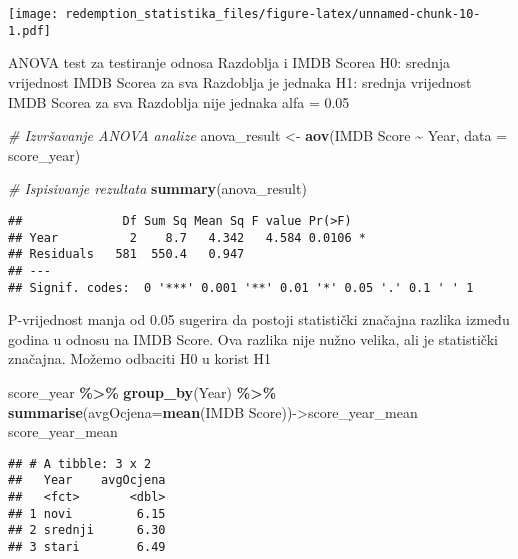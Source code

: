 \documentclass[
]{article}
\newenvironment{Shaded}{\begin{snugshade}}{\end{snugshade}}
\newcommand{\AttributeTok}[1]{\textcolor[rgb]{0.13,0.29,0.53}{#1}}
\newcommand{\CommentTok}[1]{\textcolor[rgb]{0.56,0.35,0.01}{\textit{#1}}}
\newcommand{\FunctionTok}[1]{\textcolor[rgb]{0.13,0.29,0.53}{\textbf{#1}}}
\newcommand{\NormalTok}[1]{#1}
\newcommand{\OtherTok}[1]{\textcolor[rgb]{0.56,0.35,0.01}{#1}}
\newcommand{\SpecialCharTok}[1]{\textcolor[rgb]{0.81,0.36,0.00}{\textbf{#1}}}
\newcommand{\StringTok}[1]{\textcolor[rgb]{0.31,0.60,0.02}{#1}}
\begin{document}
\texttt{[image: redemption\_statistika\_files/figure-latex/unnamed-chunk-10-1.pdf]}

ANOVA test za testiranje odnosa Razdoblja i IMDB Scorea H0: srednja
vrijednost IMDB Scorea za sva Razdoblja je jednaka H1: srednja
vrijednost IMDB Scorea za sva Razdoblja nije jednaka alfa = 0.05

\begin{Shaded}
\begin{Highlighting}[]
\CommentTok{\# Izvršavanje ANOVA analize}
\NormalTok{anova\_result }\OtherTok{\textless{}{-}} \FunctionTok{aov}\NormalTok{(}\StringTok{\textasciigrave{}}\AttributeTok{IMDB Score}\StringTok{\textasciigrave{}} \SpecialCharTok{\textasciitilde{}}\NormalTok{ Year, }\AttributeTok{data =}\NormalTok{ score\_year)}

\CommentTok{\# Ispisivanje rezultata}
\FunctionTok{summary}\NormalTok{(anova\_result)}
\end{Highlighting}
\end{Shaded}

\begin{verbatim}
##              Df Sum Sq Mean Sq F value Pr(>F)  
## Year          2    8.7   4.342   4.584 0.0106 *
## Residuals   581  550.4   0.947                 
## ---
## Signif. codes:  0 '***' 0.001 '**' 0.01 '*' 0.05 '.' 0.1 ' ' 1
\end{verbatim}

P-vrijednost manja od 0.05 sugerira da postoji statistički značajna
razlika između godina u odnosu na IMDB Score. Ova razlika nije nužno
velika, ali je statistički značajna. Možemo odbaciti H0 u korist H1

\begin{Shaded}
\begin{Highlighting}[]
\NormalTok{score\_year }\SpecialCharTok{\%\textgreater{}\%} \FunctionTok{group\_by}\NormalTok{(Year) }\SpecialCharTok{\%\textgreater{}\%} \FunctionTok{summarise}\NormalTok{(}\AttributeTok{avgOcjena=}\FunctionTok{mean}\NormalTok{(}\StringTok{\textasciigrave{}}\AttributeTok{IMDB Score}\StringTok{\textasciigrave{}}\NormalTok{))}\OtherTok{{-}\textgreater{}}\NormalTok{score\_year\_mean}
\NormalTok{score\_year\_mean}
\end{Highlighting}
\end{Shaded}

\begin{verbatim}
## # A tibble: 3 x 2
##   Year    avgOcjena
##   <fct>       <dbl>
## 1 novi         6.15
## 2 srednji      6.30
## 3 stari        6.49
\end{verbatim}
\end{document}
